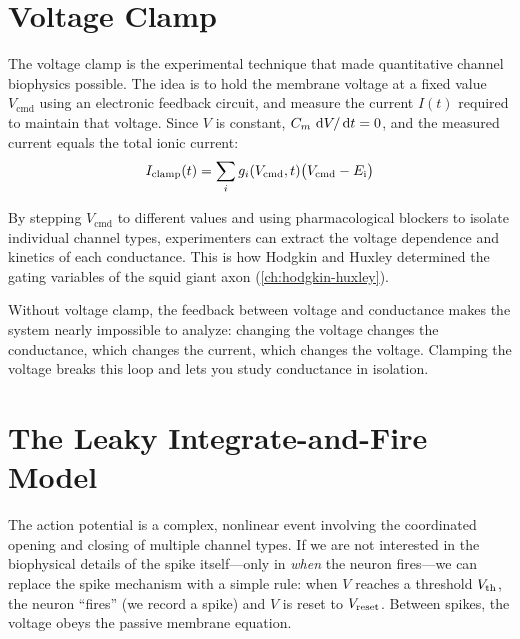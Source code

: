 \section{Voltage Clamp}
\label{sec:voltage-clamp}

The voltage clamp is the experimental technique that made quantitative channel biophysics possible. The idea is to hold the membrane voltage at a fixed value $V_{\text{cmd}}$ using an electronic feedback circuit, and measure the current $I(t)$ required to maintain that voltage. Since $V$ is constant, $C_m\,\mathop{}\!\mathrm{d} V/\mathop{}\!\mathrm{d} t = 0$, and the measured current equals the total ionic current:
%
\begin{equation}
  I_{\text{clamp}}(t) = \sum_i g_i(V_{\text{cmd}}, t)\bigl(V_{\text{cmd}} - E_{\mathrm{i}}\bigr)
  \label{eq:voltage-clamp}
\end{equation}

\noindent By stepping $V_{\text{cmd}}$ to different values and using pharmacological blockers to isolate individual channel types, experimenters can extract the voltage dependence and kinetics of each conductance. This is how Hodgkin and Huxley determined the gating variables of the squid giant axon (\cref{ch:hodgkin-huxley}).

Without voltage clamp, the feedback between voltage and conductance makes the system nearly impossible to analyze: changing the voltage changes the conductance, which changes the current, which changes the voltage. Clamping the voltage breaks this loop and lets you study conductance in isolation.

\section{The Leaky Integrate-and-Fire Model}
\label{sec:lif}

The action potential is a complex, nonlinear event involving the coordinated opening and closing of multiple channel types. If we are not interested in the biophysical details of the spike itself---only in \emph{when} the neuron fires---we can replace the spike mechanism with a simple rule: when $V$ reaches a threshold $V_{\text{th}}$, the neuron ``fires'' (we record a spike) and $V$ is reset to $V_{\text{reset}}$. Between spikes, the voltage obeys the passive membrane equation.


